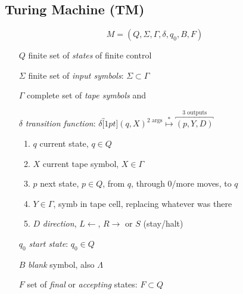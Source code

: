 \documentclass[10pt,a4paper,landscape]{article}
\begin{document}
\begin{multicols*}{3}
\section*{Turing Machine (TM)}
\vspace{0.5em}
\[
M = (Q,\Sigma,\Gamma,\delta,q_{0},B,F)
\]
\begin{itemize}
\item[$Q$] finite set of \emph{states} of finite control
\item[$\Sigma$] finite set of \emph{input symbols}: \(\Sigma \subset \Gamma\)
\item[$\Gamma$] complete set of \emph{tape symbols} and
\item[$\delta$] \emph{transition function}:
  \(
\delta\overbracket[1pt]{(q,X)}^\text{2 args} \overset{*}{\mapsto} \overbracket{(p,Y,D)}^\text{3 outputs}
  \)
  \begin{enumerate}
    \item \(q\) current state, \(q \in Q\)
    \item \(X\) current tape symbol, \(X \in \Gamma\)
    \item \(p\) next state, \(p \in Q\), from \(q\), through 0/more moves, to \(q\)
    \item \(Y \in \Gamma\), symb in tape cell, replacing whatever was there
    \item \(D\) \emph{direction}, \(L \leftarrow\), \(R \rightarrow\) or \(S\) (stay/halt)
 \end{enumerate}
\item[$q_{0}$] \emph{start state}: \(q_{0} \in Q\)
\item[$B$] \emph{blank} symbol, also \(\Lambda\)
\item[$F$] set of \emph{final} or \emph{accepting} states: \(F \subset Q\)
\end{itemize}
\end{multicols*}
\end{document}
